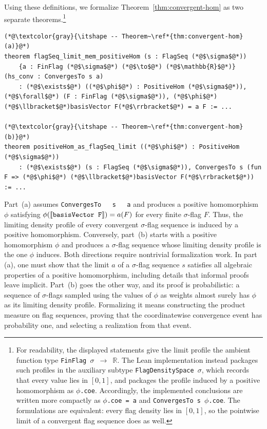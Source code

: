 \documentclass[acmsmall,screen=true,acmthm=false]{acmart}
\DeclareRobustCommand{\lean}[1]{{\def\_{\textunderscore\allowbreak}\texttt{#1}}}
\begin{document}
Using these definitions, we formalize Theorem~\ref{thm:convergent-hom} as two
separate theorems.\footnote{For readability, the displayed statements give the
limit profile the ambient function type
\lean{FinFlag $\sigma$ $\to$ $\mathbb{R}$}.  The Lean implementation instead
packages such profiles in the auxiliary subtype
\lean{FlagDensitySpace}~\(\sigma\), which records that every value lies in
\([0,1]\), and packages the profile induced by a positive homomorphism as
\lean{$\phi$.coe}.  Accordingly, the implemented conclusions are written more
compactly as \lean{$\phi$.coe = a} and
\lean{ConvergesTo s $\phi$.coe}.  The formulations are equivalent: every flag
density lies in \([0,1]\), so the pointwise limit of a convergent flag sequence
does as well.}
\begin{lstlisting}
(*@\textcolor{gray}{\itshape -- Theorem~\ref*{thm:convergent-hom} (a)}@*)
theorem flagSeq_limit_mem_positiveHom (s : FlagSeq (*@$\sigma$@*))
    {a : FinFlag (*@$\sigma$@*) (*@$\to$@*) (*@$\mathbb{R}$@*)} (hs_conv : ConvergesTo s a)
    : (*@$\exists$@*) ((*@$\phi$@*) : PositiveHom (*@$\sigma$@*)), (*@$\forall$@*) (F : FinFlag (*@$\sigma$@*)), (*@$\phi$@*) (*@$\llbracket$@*)basisVector F(*@$\rrbracket$@*) = a F := ...

(*@\textcolor{gray}{\itshape -- Theorem~\ref*{thm:convergent-hom} (b)}@*)
theorem positiveHom_as_flagSeq_limit ((*@$\phi$@*) : PositiveHom (*@$\sigma$@*))
    : (*@$\exists$@*) (s : FlagSeq (*@$\sigma$@*)), ConvergesTo s (fun F => (*@$\phi$@*) (*@$\llbracket$@*)basisVector F(*@$\rrbracket$@*)) := ...
\end{lstlisting}
Part~(a) assumes \lean{ConvergesTo\,\,\,s\,\,\,a} and produces a positive
homomorphism \(\phi\) satisfying
\(\phi(\llbracket\lean{basisVector F}\rrbracket)=a(F)\) for every finite
\(\sigma\)-flag \(F\).  Thus, the limiting density profile of every convergent
\(\sigma\)-flag sequence is induced by a positive homomorphism.  Conversely,
part~(b) starts with a positive homomorphism \(\phi\) and produces a
\(\sigma\)-flag sequence whose limiting density profile is the one \(\phi\)
induces.
Both directions require nontrivial formalization work.  In part (a), one must
show that the limit \(a\) of a \(\sigma\)-flag sequence \(s\) satisfies all algebraic
properties of a positive homomorphism, including details that informal proofs
leave implicit.  Part~(b) goes the other way, and its proof is probabilistic:
a sequence of \(\sigma\)-flags sampled using the values of \(\phi\) as weights
almost surely has \(\phi\) as its limiting density profile.  Formalizing it
means constructing the product measure on flag sequences, proving that the
coordinatewise convergence event has probability one, and selecting a
realization from that event.
\end{document}
